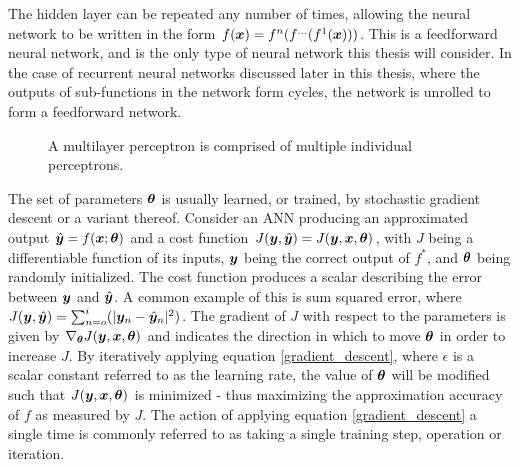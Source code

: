 The hidden layer can be repeated any number of times, allowing the neural network to be written in the form $f({\bm{x}}) = f^n(f^{\ldots}(f^1({\bm{x}})))$.
This is a feedforward neural network, and is the only type of neural network this thesis will consider.
In the case of recurrent neural networks discussed later in this thesis, where the outputs of sub-functions in the network form cycles, the network is unrolled to form a feedforward network.

\begin{figure}[htbp]
	\centering
	\quad\quad
	\caption{A multilayer perceptron is comprised of multiple individual perceptrons.}
	\label{fig:simple-ann}
\end{figure}

The set of parameters ${\bm{\theta}}$ is usually learned, or trained, by stochastic gradient descent \citep{Bottou2011} or a variant thereof.
Consider an ANN producing an approximated output $\hat{{\bm{y}}} = f({\bm{x}}; {\bm{\theta}})$ and a cost function $J({\bm{y}}, \hat{{\bm{y}}}) = J({\bm{y}}, {\bm{x}}, {\bm{\theta}})$, with  $J$ being a differentiable function of its inputs, ${\bm{y}}$ being the correct output of $f^*$, and ${\bm{\theta}}$ being randomly initialized.
The cost function produces a scalar describing the error between ${\bm{y}}$ and $\hat{{\bm{y}}}$.
A common example of this is sum squared error, where $J({\bm{y}}, \hat{{\bm{y}}}) = \sum_{n=o}^{i}(|{\bm{y}}_n - \hat{{\bm{y}}}_n|^2)$.
The gradient of $J$ with respect to the parameters is given by $\nabla_{{\bm{\theta}}}J({\bm{y}}, {\bm{x}}, {\bm{\theta}})$ and indicates the direction in which to move ${\bm{\theta}}$ in order to increase $J$.
By iteratively applying equation \ref{gradient_descent}, where $\epsilon$ is a scalar constant referred to as the learning rate, the value of ${\bm{\theta}}$ will be modified such that $J({\bm{y}}, {\bm{x}}, {\bm{\theta}})$ is minimized - thus maximizing the approximation accuracy of $f$ as measured by $J$.
The action of applying equation \ref{gradient_descent} a single time is commonly referred to as taking a single training step, operation or iteration.

